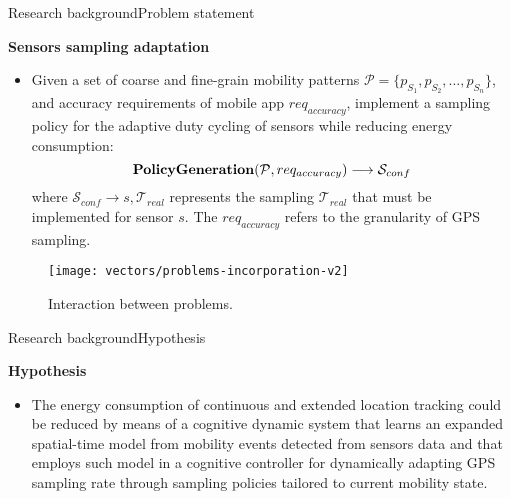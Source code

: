 \begin{frame}{Research background}{Problem statement}
\small

\begin{exampleblock}{\small \textbf{Sensors sampling adaptation}}
\begin{itemize}
\item Given a set of coarse and fine-grain mobility patterns $\mathcal{P} = \{ p_{S_1}, p_{S_2}, \ldots, p_{S_n} \}$, and accuracy requirements of mobile app $req_{accuracy}$, implement a sampling policy for the adaptive duty cycling of sensors while reducing energy consumption:
\begin{equation*}
  \text{\textbf{PolicyGeneration}}( \mathcal{P}, req_{accuracy}) \longrightarrow{} \mathcal{S}_{conf}
\end{equation*}
where $\mathcal{S}_{conf} \rightarrow s, \mathcal{T}_{real}$ represents the sampling $\mathcal{T}_{real}$ that must be implemented for sensor $s$.
The $req_{accuracy}$ refers to the granularity of GPS sampling.
\end{itemize}
\end{exampleblock}

\begin{figure}[tb]
  \centering
  \texttt{[image: vectors/problems-incorporation-v2]}
  \caption{Interaction between problems.}
\end{figure}
\end{frame}

\begin{frame}{Research background}{Hypothesis}
\small
\begin{block}{\small \textbf{Hypothesis}}
\renewcommand{\baselinestretch}{1.4}
\begin{itemize}
  \item The energy consumption of continuous and extended location tracking could be reduced by means of a cognitive dynamic system that learns an expanded spatial-time model from mobility events detected from sensors data and that employs such model in a cognitive controller for dynamically adapting GPS sampling rate through sampling policies tailored to current mobility state.
\end{itemize}
\end{block}
\end{frame}

